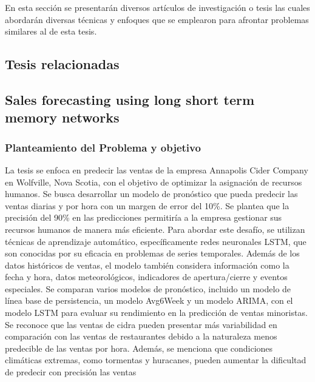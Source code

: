 En esta sección se presentarán diversos artículos de investigación o tesis las cuales abordarán diversas técnicas y enfoques que se emplearon para afrontar problemas similares al de esta tesis.




\subsection{Tesis relacionadas}
\subsection{Sales forecasting using long short term memory networks}

\subsubsection{Planteamiento del Problema y objetivo }
La tesis se enfoca en predecir las ventas de la empresa Annapolis Cider Company en Wolfville, Nova Scotia, con el objetivo de optimizar la asignación de recursos humanos. Se busca desarrollar un modelo de pronóstico que pueda predecir las ventas diarias y por hora con un margen de error del 10\%. Se plantea que la precisión del 90\% en las predicciones permitiría a la empresa gestionar sus recursos humanos de manera más eficiente.
Para abordar este desafío, se utilizan técnicas de aprendizaje automático, específicamente redes neuronales LSTM, que son conocidas por su eficacia en problemas de series temporales. Además de los datos históricos de ventas, el modelo también considera información como la fecha y hora, datos meteorológicos, indicadores de apertura/cierre y eventos especiales. Se comparan varios modelos de pronóstico, incluido un modelo de línea base de persistencia, un modelo Avg6Week y un modelo ARIMA, con el modelo LSTM para evaluar su rendimiento en la predicción de ventas minoristas.
Se reconoce que las ventas de cidra pueden presentar más variabilidad en comparación con las ventas de restaurantes debido a la naturaleza menos predecible de las ventas por hora. Además, se menciona que condiciones climáticas extremas, como tormentas y huracanes, pueden aumentar la dificultad de predecir con precisión las ventas


